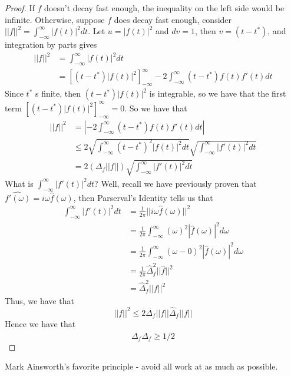 \documentclass{article}
\begin{document}
\begin{proof}
    If $f$ doesn't decay fast enough, the inequality on the left side would be infinite. Otherwise, suppose $f$ does decay fast enough, consider $||f||^2 = \int_{-\infty}^\infty |f(t)|^2 dt$. Let $u = |f(t)|^2$ and $dv = 1$, then $v = (t - t^*)$, and integration by parts gives
   \begin{align*}
       ||f||^2 &= \int_{-\infty}^\infty |f(t)|^2 dt\\
       &= [(t - t^*) |f(t)|^2]_{-\infty}^\infty - 2\int_{-\infty}^\infty (t - t^*) f(t) f'(t) dt
   \end{align*}
   Since $t^*$ s finite, then $(t - t^*) |f(t)|^2$ is integrable, so we have that the first term $[(t - t^*) |f(t)|^2]_{-\infty}^\infty = 0$. So we have that
   \begin{align*}
       ||f||^2 &= |-2 \int_{-\infty}^\infty (t - t^*) f(t) f'(t) dt|\\
       &\leq 2\sqrt{\int_{-\infty}^\infty (t - t^*)^2 |f(t)|^2 dt} \sqrt{\int_{-\infty}^\infty |f'(t)|^2 dt} \tag*{Cauchy Schwartz Inequality}\\
       &= 2(\Delta_f ||f||) \sqrt{\int_{-\infty}^\infty |f'(t)|^2 dt}
   \end{align*}
   What is $\int_{-\infty}^\infty |f'(t)|^2 dt$? Well, recall we have previously proven that $\widehat{f'(\omega)} = i \omega \widehat{f}(\omega)$, then Parserval's Identity tells us that
   \begin{align*}
       \int_{-\infty}^\infty |f'(t)|^2 dt &=  \frac{1}{2\pi} ||i \omega \widehat{f}(\omega)||^2\\
       &= \frac{1}{2\pi} \int_{-\infty}^\infty (\omega)^2 |\widehat{f}(\omega)|^2 d\omega\\
       &= \frac{1}{2\pi} \int_{-\infty}^\infty (\omega - 0)^2 |\widehat{f}(\omega)|^2 d\omega\\
       &= \frac{1}{2\pi} \widehat{\Delta}_f^2 ||\widehat{f}||^2 \tag*{Since $\omega^* = 0$ as $f$ is real valued}\\
       &= \widehat{\Delta}_f^2 ||f||^2
   \end{align*}
   Thus, we have that
   \[||f||^2 \leq 2 \Delta_f ||f|| \widehat{\Delta}_f ||f||\]
   Hence we have that
   \[\Delta_f \widehat{\Delta}_f \geq 1/2\]
\end{proof}

\begin{proposition}
    Mark Ainsworth's favorite principle - avoid all work at as much as possible.
\end{proposition}
\end{document}
